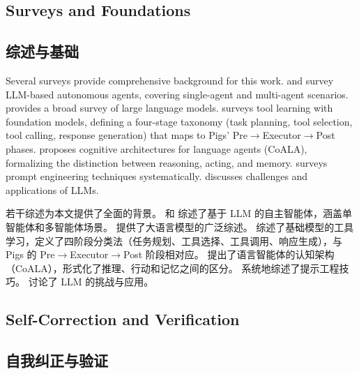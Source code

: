 \subsection{Surveys and Foundations}
\begin{chinese}
\subsection{综述与基础}
\end{chinese}

Several surveys provide comprehensive background for this work. \citet{xi2023rise} and \citet{wang2023agent_survey} survey LLM-based autonomous agents, covering single-agent and multi-agent scenarios. \citet{zhao2023llm_survey} provides a broad survey of large language models. \citet{qin2023tool_learning_survey} surveys tool learning with foundation models, defining a four-stage taxonomy (task planning, tool selection, tool calling, response generation) that maps to Pigs' Pre$\rightarrow$Executor$\rightarrow$Post phases. \citet{sumers2023coala} proposes cognitive architectures for language agents (CoALA), formalizing the distinction between reasoning, acting, and memory. \citet{schulhoff2024prompt} surveys prompt engineering techniques systematically. \citet{kaddour2023challenges} discusses challenges and applications of LLMs.
\begin{chinese}
若干综述为本文提供了全面的背景。\citet{xi2023rise} 和 \citet{wang2023agent_survey} 综述了基于 LLM 的自主智能体，涵盖单智能体和多智能体场景。\citet{zhao2023llm_survey} 提供了大语言模型的广泛综述。\citet{qin2023tool_learning_survey} 综述了基础模型的工具学习，定义了四阶段分类法（任务规划、工具选择、工具调用、响应生成），与 Pigs 的 Pre$\rightarrow$Executor$\rightarrow$Post 阶段相对应。\citet{sumers2023coala} 提出了语言智能体的认知架构（CoALA），形式化了推理、行动和记忆之间的区分。\citet{schulhoff2024prompt} 系统地综述了提示工程技巧。\citet{kaddour2023challenges} 讨论了 LLM 的挑战与应用。
\end{chinese}

\subsection{Self-Correction and Verification}
\begin{chinese}
\subsection{自我纠正与验证}
\end{chinese}

